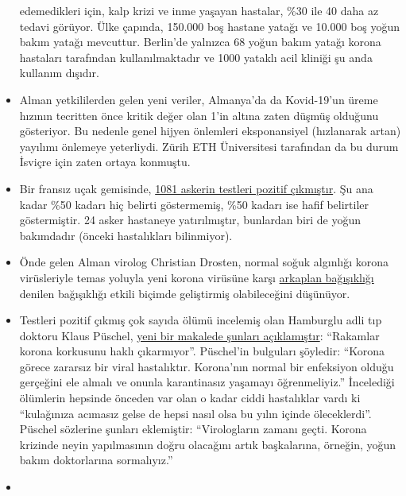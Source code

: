 \begin{itemize}
  edemedikleri için, kalp krizi ve inme yaşayan hastalar, \%30 ile 40
  daha az tedavi görüyor. Ülke çapında, 150.000 boş hastane yatağı ve
  10.000 boş yoğun bakım yatağı mevcuttur. Berlin'de yalnızca 68 yoğun
  bakım yatağı korona hastaları tarafından kullanılmaktadır ve 1000
  yataklı acil kliniği şu anda kullanım dışıdır.
\item
  Alman yetkililerden gelen yeni veriler, Almanya'da da Kovid-19'un
  üreme hızının tecritten önce kritik değer olan 1'in altına zaten
  düşmüş olduğunu gösteriyor. Bu nedenle genel hijyen önlemleri
  eksponansiyel (hızlanarak artan) yayılımı önlemeye yeterliydi. Zürih
  ETH Üniversitesi tarafından da bu durum İsviçre için zaten ortaya
  konmuştu.
\item
  Bir fransız uçak gemisinde,
  \href{https://www.ouest-france.fr/sante/virus/coronavirus/coronavirus-au-moins-940-marins-positifs-sur-le-charles-de-gaulle-et-son-escorte-6810816}{1081
  askerin testleri pozitif çıkmıştır}. Şu ana kadar \%50 kadarı hiç
  belirti göstermemiş, \%50 kadarı ise hafif belirtiler göstermiştir. 24
  asker hastaneye yatırılmıştır, bunlardan biri de yoğun bakımdadır
  (önceki hastalıkları bilinmiyor).
\item
  Önde gelen Alman virolog Christian Drosten, normal soğuk algınlığı
  korona virüsleriyle temas yoluyla yeni korona virüsüne karşı
  \href{https://www.watson.de/!324026684}{arkaplan bağışıklığı} denilen
  bağışıklığı etkili biçimde geliştirmiş olabileceğini düşünüyor.
\item
  Testleri pozitif çıkmış çok sayıda ölümü incelemiş olan Hamburglu adli
  tıp doktoru Klaus Püschel,
  \href{https://www.abendblatt.de/hamburg/article228908865/hamburg-corona-virus-uke-infektion-covid-19-pueschel-coronavirus-krise-patienten-impfstoff-immunitaet-krankenhaeuser-kontaktverbot-kliniken-infektionsrate-krankheit-pandemie-test-lungenkrankheit-sars-cov-epidemie-sars-cov-2.html}{yeni
  bir makalede şunları açıklamıştır}: ``Rakamlar korona korkusunu haklı
  çıkarmıyor''. Püschel'in bulguları şöyledir: ``Korona görece zararsız
  bir viral hastalıktır. Korona'nın normal bir enfeksiyon olduğu
  gerçeğini ele almalı ve onunla karantinasız yaşamayı öğrenmeliyiz.''
  İncelediği ölümlerin hepsinde önceden var olan o kadar ciddi
  hastalıklar vardı ki ``kulağınıza acımasız gelse de hepsi nasıl olsa
  bu yılın içinde öleceklerdi''. Püschel sözlerine şunları eklemiştir:
  ``Virologların zamanı geçti. Korona krizinde neyin yapılmasının doğru
  olacağını artık başkalarına, örneğin, yoğun bakım doktorlarına
  sormalıyız.''
\item

\end{itemize}
